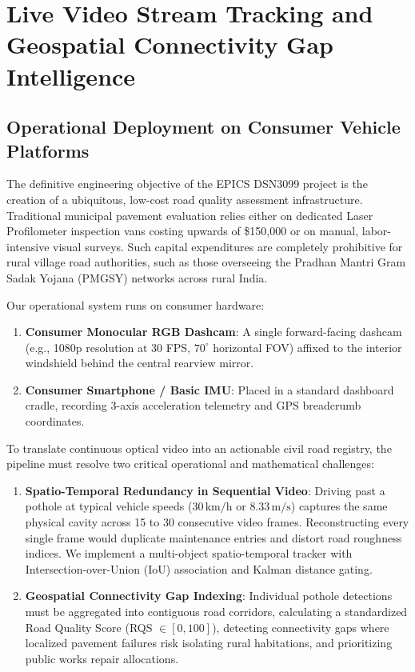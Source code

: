 \section{Live Video Stream Tracking and Geospatial Connectivity Gap Intelligence}
\label{sec:video_tracking_and_gis_mapper}

\subsection{Operational Deployment on Consumer Vehicle Platforms}
The definitive engineering objective of the EPICS DSN3099 project is the creation of a ubiquitous, low-cost road quality assessment infrastructure. Traditional municipal pavement evaluation relies either on dedicated Laser Profilometer inspection vans costing upwards of \$150,000 or on manual, labor-intensive visual surveys. Such capital expenditures are completely prohibitive for rural village road authorities, such as those overseeing the Pradhan Mantri Gram Sadak Yojana (PMGSY) networks across rural India.

Our operational system runs on consumer hardware:
\begin{enumerate}
    \item \textbf{Consumer Monocular RGB Dashcam}: A single forward-facing dashcam (e.g., 1080p resolution at 30 FPS, $70^\circ$ horizontal FOV) affixed to the interior windshield behind the central rearview mirror.
    \item \textbf{Consumer Smartphone / Basic IMU}: Placed in a standard dashboard cradle, recording 3-axis acceleration telemetry and GPS breadcrumb coordinates.
\end{enumerate}

To translate continuous optical video into an actionable civil road registry, the pipeline must resolve two critical operational and mathematical challenges:
\begin{enumerate}
    \item \textbf{Spatio-Temporal Redundancy in Sequential Video}: Driving past a pothole at typical vehicle speeds ($30\,\text{km/h}$ or $8.33\,\text{m/s}$) captures the same physical cavity across 15 to 30 consecutive video frames. Reconstructing every single frame would duplicate maintenance entries and distort road roughness indices. We implement a multi-object spatio-temporal tracker with Intersection-over-Union (IoU) association and Kalman distance gating.
    \item \textbf{Geospatial Connectivity Gap Indexing}: Individual pothole detections must be aggregated into contiguous road corridors, calculating a standardized Road Quality Score (RQS $\in [0, 100]$), detecting connectivity gaps where localized pavement failures risk isolating rural habitations, and prioritizing public works repair allocations.
\end{enumerate}

